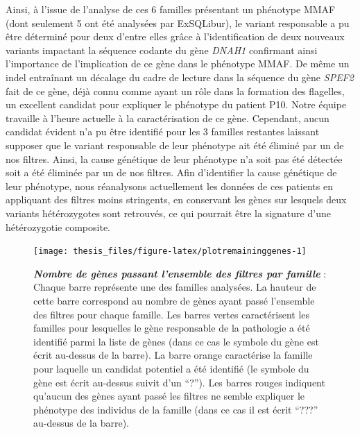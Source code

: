 \documentclass[12pt,a4paper,twoside]{ugathesis}
\theoremstyle{definition}
\theoremstyle{definition}
\theoremstyle{definition}
\theoremstyle{remark}
\begin{document}
Ainsi, à l'issue de l'analyse de ces 6 familles présentant un phénotype
MMAF (dont seulement 5 ont été analysées par ExSQLibur), le variant
responsable a pu être déterminé pour deux d'entre elles grâce à
l'identification de deux nouveaux variants impactant la séquence codante
du gène \emph{DNAH1} confirmant ainsi l'importance de l'implication de
ce gène dans le phénotype MMAF. De même un indel entraînant un décalage
du cadre de lecture dans la séquence du gène \emph{SPEF2} fait de ce
gène, déjà connu comme ayant un rôle dans la formation des flagelles, un
excellent candidat pour expliquer le phénotype du patient P10. Notre
équipe travaille à l'heure actuelle à la caractérisation de ce gène.
Cependant, aucun candidat évident n'a pu être identifié pour les 3
familles restantes laissant supposer que le variant responsable de leur
phénotype ait été éliminé par un de nos filtres. Ainsi, la cause
génétique de leur phénotype n'a soit pas été détectée soit a été
éliminée par un de nos filtres. Afin d'identifier la cause génétique de
leur phénotype, nous réanalysons actuellement les données de ces
patients en appliquant des filtres moins stringents, en conservant les
gènes sur lesquels deux variants hétérozygotes sont retrouvés, ce qui
pourrait être la signature d'une hétérozygotie composite.

\newpage

\begin{figure}

{\centering \texttt{[image: thesis\_files/figure-latex/plotremaininggenes-1]} 

}

\caption[Nombre de gènes passant l'ensemble des filtres par famille]{\textbf{\emph{Nombre de gènes passant
l'ensemble des filtres par famille}} : Chaque barre représente une des
familles analysées. La hauteur de cette barre correspond au nombre de
gènes ayant passé l'ensemble des filtres pour chaque famille. Les barres
vertes caractérisent les familles pour lesquelles le gène responsable de
la pathologie a été identifié parmi la liste de gènes (dans ce cas le
symbole du gène est écrit au-dessus de la barre). La barre orange
caractérise la famille pour laquelle un candidat potentiel a été
identifié (le symbole du gène est écrit au-dessus suivit d'un ``?'').
Les barres rouges indiquent qu'aucun des gènes ayant passé les filtres
ne semble expliquer le phénotype des individus de la famille (dans ce
cas il est écrit ``???'' au-dessus de la barre).}\label{fig:plotremaininggenes}
\end{figure}
\end{document}
